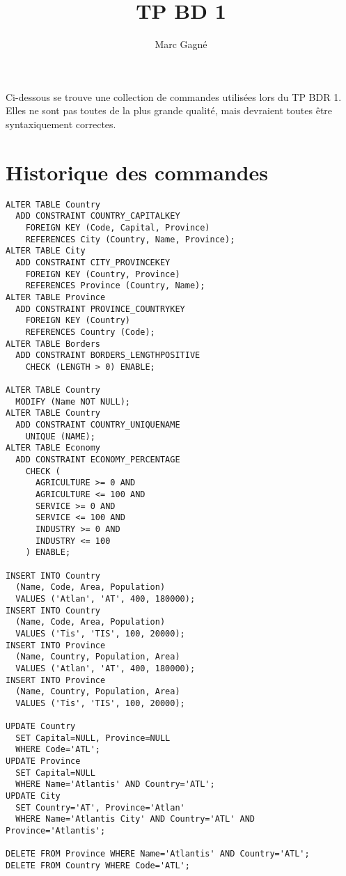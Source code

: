 \documentclass[11pt,a4paper]{article}
\begin{document}
\lstset{language=SQL}

\title{
	TP BD 1
}
\author{
	Marc Gagné
}
\maketitle

Ci-dessous se trouve une collection de commandes utilisées lors du TP BDR 1. Elles ne sont pas toutes de la plus grande qualité, mais devraient toutes être syntaxiquement correctes.

\section{Historique des commandes}

\begin{lstlisting}
ALTER TABLE Country
  ADD CONSTRAINT COUNTRY_CAPITALKEY
    FOREIGN KEY (Code, Capital, Province)
    REFERENCES City (Country, Name, Province);
ALTER TABLE City
  ADD CONSTRAINT CITY_PROVINCEKEY
    FOREIGN KEY (Country, Province)
    REFERENCES Province (Country, Name);
ALTER TABLE Province
  ADD CONSTRAINT PROVINCE_COUNTRYKEY
    FOREIGN KEY (Country)
    REFERENCES Country (Code);
ALTER TABLE Borders
  ADD CONSTRAINT BORDERS_LENGTHPOSITIVE
    CHECK (LENGTH > 0) ENABLE;

ALTER TABLE Country
  MODIFY (Name NOT NULL);
ALTER TABLE Country
  ADD CONSTRAINT COUNTRY_UNIQUENAME
    UNIQUE (NAME);
ALTER TABLE Economy
  ADD CONSTRAINT ECONOMY_PERCENTAGE
    CHECK (
      AGRICULTURE >= 0 AND
      AGRICULTURE <= 100 AND
      SERVICE >= 0 AND
      SERVICE <= 100 AND
      INDUSTRY >= 0 AND
      INDUSTRY <= 100
    ) ENABLE;

INSERT INTO Country
  (Name, Code, Area, Population)
  VALUES ('Atlan', 'AT', 400, 180000);
INSERT INTO Country
  (Name, Code, Area, Population)
  VALUES ('Tis', 'TIS', 100, 20000);
INSERT INTO Province
  (Name, Country, Population, Area)
  VALUES ('Atlan', 'AT', 400, 180000);
INSERT INTO Province
  (Name, Country, Population, Area)
  VALUES ('Tis', 'TIS', 100, 20000);

UPDATE Country
  SET Capital=NULL, Province=NULL
  WHERE Code='ATL';
UPDATE Province
  SET Capital=NULL
  WHERE Name='Atlantis' AND Country='ATL';
UPDATE City
  SET Country='AT', Province='Atlan'
  WHERE Name='Atlantis City' AND Country='ATL' AND Province='Atlantis';

DELETE FROM Province WHERE Name='Atlantis' AND Country='ATL';
DELETE FROM Country WHERE Code='ATL';


\end{lstlisting}
\end{document}
